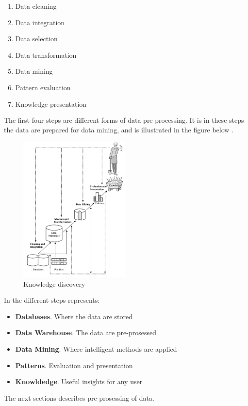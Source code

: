 \documentclass[english, a4paper]{report}
\begin{document}
{{        \begin{enumerate}\label{}
            \item Data cleaning
            \item Data integration
            \item Data selection
            \item Data transformation
            \item Data mining
            \item Pattern evaluation 
            \item Knowledge presentation
        \end{enumerate}
        The first four steps are different forms of data pre-processing. It is in these steps the data are prepared for data mining, and is illustrated in the figure below \cite{dataMining}.
        
        \begin{figure}[H]
            \centering
            \includegraphics[width=0.5\textwidth]{knowledgeDiscovery}
            \caption{Knowledge discovery \cite{dataMining}}
            \label{fig:knowledgeDiscoverySteps}
        \end{figure}
        
        In  the different steps represents:
        \begin{itemize}
            \item \textbf{Databases}. Where the data are stored
            \item \textbf{Data Warehouse}. The data are pre-prosessed
            \item \textbf{Data Mining}. Where intelligent methods are applied
            \item \textbf{Patterns}. Evaluation and presentation
            \item \textbf{Knowldedge}. Useful insights for any user
        \end{itemize}
        The next sections describes pre-prosessing of data.
                
}}
\end{document}
